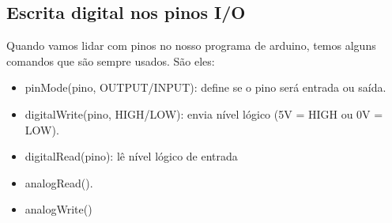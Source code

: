 \documentclass{report}
\begin{document}
	\subsection{Escrita digital nos pinos I/O}
	
	Quando vamos lidar com pinos no nosso programa de arduino, temos alguns comandos que são sempre usados. São eles:
	
	\begin{itemize}
		\item pinMode(pino, OUTPUT/INPUT): define se o pino será entrada ou saída.
		\item digitalWrite(pino, HIGH/LOW): envia nível lógico (5V = HIGH ou 0V = LOW).
		\item digitalRead(pino): lê nível lógico de entrada
		\item analogRead().
		\item analogWrite()
	\end{itemize}
	
\end{document}
